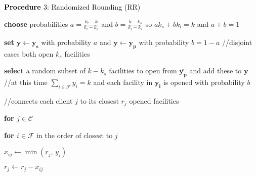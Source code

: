 \documentclass[10pt]{llncs}
\begin{document}
\begin{algorithm}
\medskip{}


\textbf{\textcolor{black}{Procedure }}\textcolor{black}{3: Randomized
Rounding (RR)}

\textbf{choose }probabilities $a=\frac{k_{l}-k}{k_{l}-k_{s}}$ and
$b=\frac{k-k_{s}}{k_{l}-k_{s}}$ so $ak_{s}+bk_{l}=k$ and $a+b=1$

\textbf{set} $\boldsymbol{y}\leftarrow\boldsymbol{y_{s}}$ with probability
$a$ and $\boldsymbol{y}\leftarrow\boldsymbol{y_{p}}$ with probability
$b=1-a$ //disjoint cases both open $k_{s}$ facilities

\textbf{select }a random subset of $k-k_{s}$ facilities to open from
$\boldsymbol{\bar{y_{p}}}$ and add these to $\boldsymbol{y}$ //at
this time $\sum_{i\in\mathcal{F}}y_{i}=k$ and each facility in $\boldsymbol{y_{l}}$
is opened with probability $b$

//connects each client $j$ to its closest $r_{j}$ opened facilities

\textbf{for $j\in\mathcal{C}$}

\qquad{}\textbf{for $i\in\mathcal{F}$ }in the order of closest to
$j$

\qquad{}\qquad{}$x_{ij}\leftarrow\min\left(r_{j},\, y_{i}\right)$

\qquad{}\qquad{}$r_{j}\leftarrow r_{j}-x_{ij}$
\end{algorithm}
\end{document}
